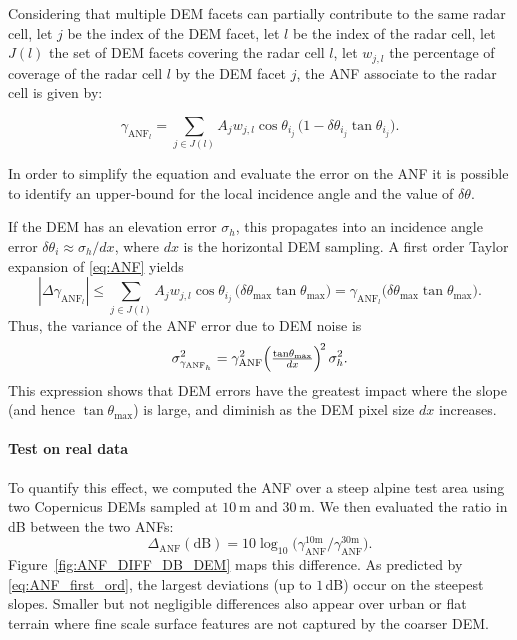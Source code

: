 Considering that multiple DEM facets can partially contribute to the same radar cell, let \(j\) be the index of the DEM facet, let \(l\) be the index of the radar cell, let \(J(l)\) the set of DEM facets covering the radar cell \(l\), let \(w_{j,l}\) the percentage of coverage of the radar cell \(l\) by the DEM facet \(j\), the ANF associate to the radar cell is given by:

\begin{equation}
  \label{eq:ANF_integral}
  \gamma_{\mathrm{ANF}_l} = \sum_{j \in J(l)} A_j w_{j,l} \cos\!\theta_{i_j} \,\bigl(1 - \delta\theta_{i_j} \tan\!\theta_{i_j}\bigr).
\end{equation}

In order to simplify the equation and evaluate the error on the ANF it is possible to identify an upper-bound for the local incidence angle and the value of \(\delta\theta\).

If the DEM has an elevation error \(\sigma_h\), this propagates into an incidence angle error \(\delta\theta_i\approx \sigma_h / dx\), where \(dx\) is the horizontal DEM sampling. A first order Taylor expansion of \eqref{eq:ANF} yields
\begin{equation}
  \label{eq:ANF_first_ord}
  |\Delta \gamma_{\mathrm{ANF}_l}| \le \sum_{j \in J(l)} A_j w_{j,l} \cos\!\theta_{i_j} \,\bigl(\delta\theta_{\mathrm{max}} \tan\!\theta_{\mathrm{max}}\bigr) = \gamma_{\mathrm{ANF}_l} \bigl(\delta\theta_{\mathrm{max}} \tan\!\theta_{\mathrm{max}}\bigr).
\end{equation}
Thus, the variance of the ANF error due to DEM noise is
\begin{equation}
  \sigma^2_{\gamma_{\mathrm{ANF}_h}}
  = \gamma^2_{\mathrm{ANF}}
    \Bigl(\tfrac{\tan\!\theta_{\mathrm{max}}}{dx}\Bigr)^{\!2}\,\sigma^2_h.
\end{equation}
This expression shows that DEM errors have the greatest impact where the slope (and hence \(\tan\theta_{\mathrm{max}}\)) is large, and diminish as the DEM pixel size \(dx\) increases.

\paragraph{Test on real data}

To quantify this effect, we computed the ANF over a steep alpine test area using two Copernicus DEMs sampled at \(10\) m and \(30\) m. We then evaluated the ratio in dB between the two ANFs:
\[
  \Delta_{\mathrm{ANF}}(\mathrm{dB})
  = 10\log_{10}\!\bigl(\gamma_{\mathrm{ANF}}^{10\mathrm{m}} / \gamma_{\mathrm{ANF}}^{30\mathrm{m}}\bigr).
\]
Figure~\ref{fig:ANF_DIFF_DB_DEM} maps this difference. As predicted by \eqref{eq:ANF_first_ord}, the largest deviations (up to \(1\)\,dB) occur on the steepest slopes. Smaller but not negligible differences also appear over urban or flat terrain where fine scale surface features are not captured by the coarser DEM.

